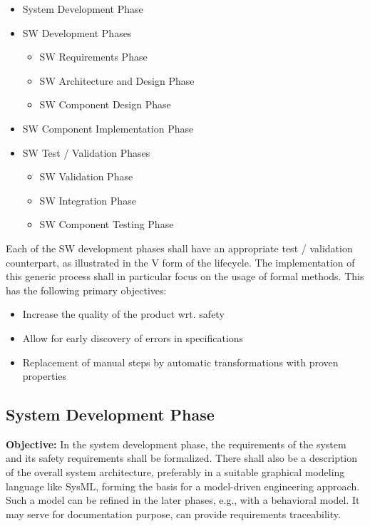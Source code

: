\begin{itemize}
\item System Development Phase
\item SW Development Phases
  \begin{itemize}
  \item SW Requirements Phase
  \item SW Architecture and Design Phase
  \item SW Component Design Phase
  \end{itemize}
\item SW Component Implementation Phase
\item SW Test / Validation Phases
  \begin{itemize}
  \item SW Validation Phase
  \item SW Integration Phase
  \item SW Component Testing Phase
  \end{itemize}
\end{itemize}

Each of the SW development phases shall have an appropriate test / validation
counterpart, as illustrated in the V form of the lifecycle. The implementation
of this generic process shall in particular focus on the usage of formal
methods. This has the following primary objectives:

\begin{itemize}
\item Increase the quality of the product wrt. safety
\item Allow for early discovery of errors in specifications
\item Replacement of manual steps by automatic transformations with proven
  properties
\end{itemize}


\subsection{System Development Phase}
\label{sec:syst-devel-phase}

{\bf Objective:} In the system development phase, the requirements of the system
and its safety requirements shall be formalized. There shall also be a
description of the overall system architecture, preferably in a suitable
graphical modeling language like SysML, forming the basis for a model-driven
engineering approach. Such a model can be refined in the later phases, e.g.,
with a behavioral model. It may serve for documentation purpose, can provide
requirements traceability.

